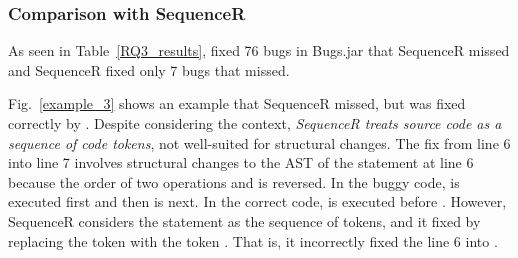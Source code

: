 \subsubsection{\bf Comparison with SequenceR}

As seen in Table~\ref{RQ3_results}, {\tool} fixed 76 bugs in Bugs.jar
that SequenceR missed and SequenceR fixed only 7 bugs that
{\tool} missed.

Fig.~\ref{example_3} shows an example that SequenceR missed, but was
fixed correctly by {\tool}. Despite considering the context, {\em
  SequenceR treats source code as a sequence of code tokens}, not
well-suited for structural changes. The fix from line 6 into line 7
involves structural changes to the AST of the statement at line 6
because the order of two operations  and \code{\%} is
reversed. In the buggy code,  is executed first and then
\code{\%} is next. In the correct code, \code{\%} is executed before
.
However, SequenceR considers the statement as the sequence of tokens,
and it fixed by replacing the token  with the token
. That is, it incorrectly fixed the line 6 into
   
\code{\%} .


